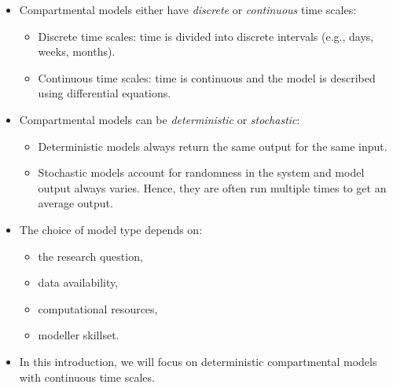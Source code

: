 \documentclass[
  ignorenonframetext,
]{beamer}
\providecommand{\tightlist}{%
  \setlength{\itemsep}{0pt}\setlength{\parskip}{0pt}}\usepackage{longtable,booktabs,array}
\begin{document}
\begin{frame}
\begin{itemize}
\tightlist
\item
  Compartmental models either have \emph{discrete} or \emph{continuous}
  time scales:

  \begin{itemize}
  \tightlist
  \item
    {Discrete time scales}: time is divided into discrete intervals
    (e.g., days, weeks, months).
  \item
    {Continuous time scales}: time is continuous and the model is
    described using differential equations.
  \end{itemize}
\end{itemize}
\end{frame}

\begin{frame}
\begin{itemize}
\tightlist
\item
  Compartmental models can be \emph{deterministic} or \emph{stochastic}:

  \begin{itemize}
  \tightlist
  \item
    {Deterministic} models always return the same output for the same
    input.
  \item
    {Stochastic} models account for randomness in the system and model
    output always varies. Hence, they are often run multiple times to
    get an average output.
  \end{itemize}
\end{itemize}
\end{frame}

\begin{frame}
\begin{itemize}
\tightlist
\item
  The choice of model type depends on:

  \begin{itemize}
  \tightlist
  \item
    the research {question},
  \item
    {data} availability,
  \item
    {computational resources},
  \item
    modeller {skillset}.
  \end{itemize}
\item
  In this introduction, we will focus on {deterministic compartmental
  models with continuous time scales}.
\end{itemize}
\end{frame}
\end{document}
